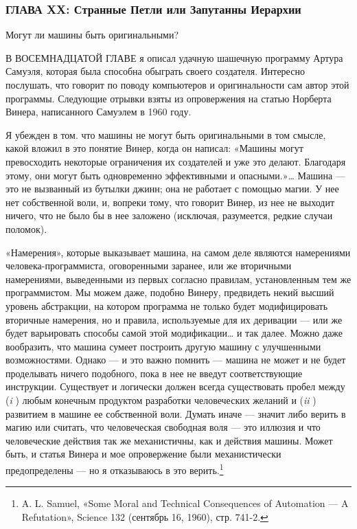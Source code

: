 \subsubsection{ГЛАВА XX: Странные Петли или Запутанны Иерархии}

Могут ли машины быть оригинальными?

В ВОСЕМНАДЦАТОЙ ГЛАВЕ я описал удачную шашечную программу Артура Самуэля, которая была способна обыграть своего создателя. Интересно послушать, что говорит по поводу компьютеров и оригинальности сам автор этой программы. Следующие отрывки взяты из опровержения на статью Норберта Винера, написанного Самуэлем в 1960 году.

Я убежден в том. что машины не могут быть оригинальными в том смысле, какой вложил в это понятие Винер, когда он написал: «Машины могут превосходить некоторые ограничения их создателей и уже это делают. Благодаря этому, они могут быть одновременно эффективными и опасными.»\ldots{} Машина --- это не вызванный из бутылки джинн; она не работает с помощью магии. У нее нет собственной воли, и, вопреки тому, что говорит Винер, из нее не выходит ничего, что не было бы в нее заложено (исключая, разумеется, редкие случаи поломок).

«Намерения», которые выказывает машина, на самом деле являются намерениями человека-программиста, оговоренными заранее, или же вторичными намерениями, выведенными из первых согласно правилам, установленным тем же программистом. Мы можем даже, подобно Винеру, предвидеть некий высший уровень абстракции, на котором программа не только будет модифицировать вторичные намерения, но и правила, используемые для их деривации --- или же будет варьировать способы самой этой модификации\ldots{} и так далее. Можно даже вообразить, что машина сумеет построить другую машину с улучшенными возможностями. Однако --- и это важно помнить --- машина не может и не будет проделывать ничего подобного, пока в нее не введут соответствующие инструкции. Существует и логически должен всегда существовать пробел между (\emph{i} ) любым конечным продуктом разработки человеческих желаний и (\emph{ii} ) развитием в машине ее собственной воли. Думать иначе --- значит либо верить в магию или считать, что человеческая свободная воля --- это иллюзия и что человеческие действия так же механистичны, как и действия машины. Может быть, и статья Винера и мое опровержение были механистически предопределены --- но я отказываюсь в это верить.\footnote{A. L. Samuel, «Some Moral and Technical Consequences of Automation --- A Refutation», Science 132 (сентябрь 16, 1960), стр. 741-2.}


